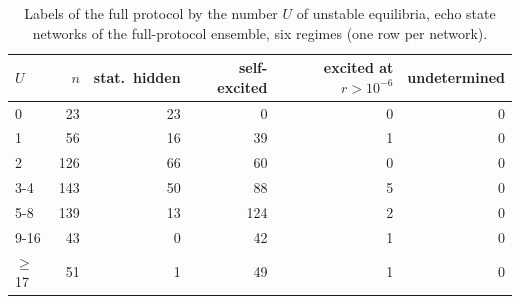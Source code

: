 \begin{table}
\caption{Labels of the full protocol by the number $U$ of unstable equilibria, echo state networks of the full-protocol
ensemble, six regimes (one row per network).}
\label{tab:sm_labels}
\begin{ruledtabular}
\begin{tabular}{lrrrrr}
$U$ & $n$ & stat.\ hidden & self-excited & excited at $r>10^{-6}$ & undetermined \\
\hline
0 & 23 & 23 & 0 & 0 & 0 \\
1 & 56 & 16 & 39 & 1 & 0 \\
2 & 126 & 66 & 60 & 0 & 0 \\
3-4 & 143 & 50 & 88 & 5 & 0 \\
5-8 & 139 & 13 & 124 & 2 & 0 \\
9-16 & 43 & 0 & 42 & 1 & 0 \\
$\ge$17 & 51 & 1 & 49 & 1 & 0 \\
\end{tabular}
\end{ruledtabular}
\end{table}
